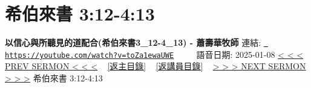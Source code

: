 \documentclass{book}
\begin{document}
\section{希伯來書 3:12-4:13}
\label{sec:toZa1ewaUWE}
\textbf{以信心與所聽見的道配合(希伯來書3\_12-4\_13) - 蕭壽華牧師}
\newline
\newline
連結: \href{https://youtube.com/watch?v=toZa1ewaUWE}{\texttt{ https://youtube.com/watch?v=toZa1ewaUWE}} ~~~~ 語音日期: 2025-01-08 
\newline
\newline
\hyperref[sec:fJrsPMmDHtU]{< < < PREV SERMON < < <}
~
\hyperlink{toc}{[返主目錄]}
~
\hyperref[ch:preacher4]{[返講員目錄]}
~
\hyperref[sec:8LlYAk0Xlok]{> > > NEXT SERMON > > >}
\newline
\newline
希伯來書 3:12-4:13
\newline
\end{document}
